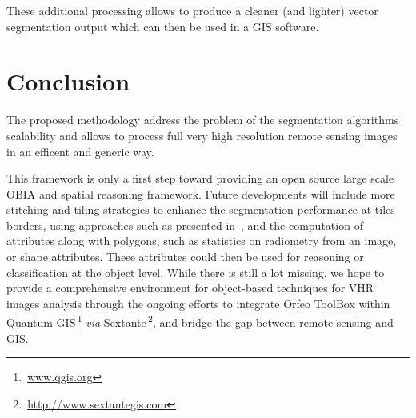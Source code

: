 \documentclass{josis}
\newcommand{\furl}[1]{$\,$\footnote{$\,$\url{#1}}}
\begin{document}
These additional processing allows to produce a cleaner (and lighter) vector
segmentation output which can then be used in a GIS software.

\section{Conclusion}

The proposed methodology address the problem of the segmentation algorithms
scalability and allows to process full very high resolution remote sensing
images in an efficent and generic way.

This framework is only a first step toward providing an open source
large scale OBIA and spatial reasoning framework. Future developments
will include more stitching and tiling strategies to enhance the
segmentation performance at tiles borders, using approaches such as
presented in~\cite{crisp2003fast}, and the computation of attributes
along with polygons, such as statistics on radiometry from an image,
or shape attributes. These attributes could then be used for reasoning
or classification at the object level. While there is still a lot
missing, we hope to provide a comprehensive environment for
object-based techniques for VHR images analysis through the ongoing
efforts to integrate Orfeo ToolBox within Quantum
GIS\furl{www.qgis.org} \textit{via}
Sextante\furl{http://www.sextantegis.com}, and bridge the
gap between remote sensing and GIS.



\end{document}
